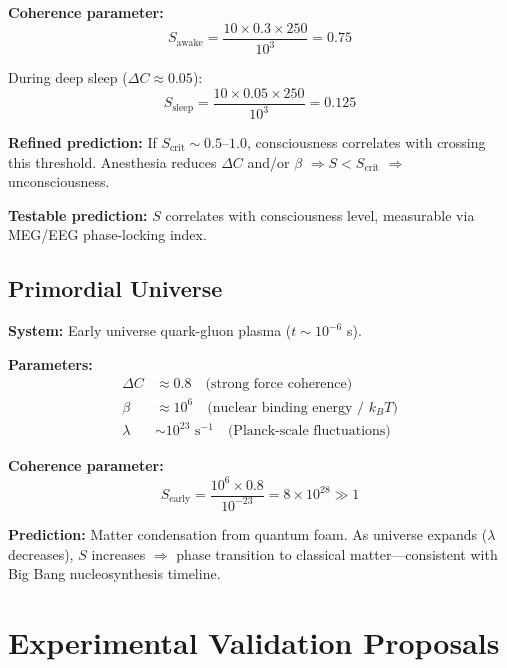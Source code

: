 \documentclass[12pt,a4paper]{article}
\begin{document}
\textbf{Coherence parameter:}
\begin{equation}
S_{\text{awake}} = \frac{10 \times 0.3 \times 250}{10^3} = 0.75
\end{equation}

During deep sleep ($\Delta C \approx 0.05$):
\begin{equation}
S_{\text{sleep}} = \frac{10 \times 0.05 \times 250}{10^3} = 0.125
\end{equation}

\textbf{Refined prediction:} If $S_{\text{crit}} \sim 0.5$--$1.0$, consciousness correlates with crossing this threshold. Anesthesia reduces $\Delta C$ and/or $\beta$ $\Rightarrow S < S_{\text{crit}}$ $\Rightarrow$ unconsciousness.

\textbf{Testable prediction:} $S$ correlates with consciousness level, measurable via MEG/EEG phase-locking index.

\subsection{Primordial Universe}

\textbf{System:} Early universe quark-gluon plasma ($t \sim 10^{-6}$ s).

\textbf{Parameters:}
\begin{align}
\Delta C &\approx 0.8 \quad \text{(strong force coherence)} \\
\beta &\approx 10^6 \quad \text{(nuclear binding energy / $k_B T$)} \\
\lambda &\sim 10^{23} \text{ s}^{-1} \quad \text{(Planck-scale fluctuations)}
\end{align}

\textbf{Coherence parameter:}
\begin{equation}
S_{\text{early}} = \frac{10^6 \times 0.8}{10^{-23}} = 8 \times 10^{28} \gg 1
\end{equation}

\textbf{Prediction:} Matter condensation from quantum foam. As universe expands ($\lambda$ decreases), $S$ increases $\Rightarrow$ phase transition to classical matter---consistent with Big Bang nucleosynthesis timeline.

\section{Experimental Validation Proposals}
\label{sec:experiments}
\end{document}
